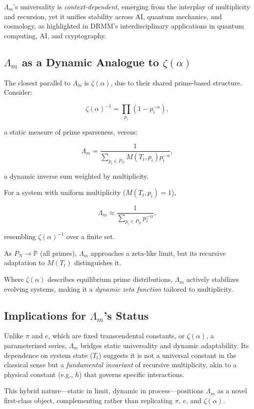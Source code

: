 \documentclass{article}
\theoremstyle{plain}
\begin{document}
\(\Lambda_m\)'s universality is \textit{context-dependent}, emerging from the interplay of multiplicity and recursion, yet it unifies stability across AI, quantum mechanics, and cosmology, as highlighted in DRMM's interdisciplinary applications in quantum computing, AI, and cryptography.

\subsection{\(\Lambda_m\) as a Dynamic Analogue to \(\zeta(\alpha)\)}

The closest parallel to \(\Lambda_m\) is \(\zeta(\alpha)\), due to their shared prime-based structure. Consider:

\[
\zeta(\alpha)^{-1} = \prod_{p_i} (1 - p_i^{-\alpha}),
\]

a static measure of prime sparseness, versus:

\[
\Lambda_m = \frac{1}{\sum_{p_i \in P_N} M(T_t, p_i) p_i^{-\alpha}},
\]

a dynamic inverse sum weighted by multiplicity. 

For a system with uniform multiplicity (\(M(T_t, p_i) = 1\)), 

\[
\Lambda_m \approx \frac{1}{\sum_{p_i \in P_N} p_i^{-\alpha}},
\]

resembling \(\zeta(\alpha)^{-1}\) over a finite set. 

As \(P_N \to \mathbb{P}\) (all primes), \(\Lambda_m\) approaches a zeta-like limit, but its recursive adaptation to \(M(T_t)\) distinguishes it. 

Where \(\zeta(\alpha)\) describes equilibrium prime distributions, \(\Lambda_m\) actively stabilizes evolving systems, making it a \textit{dynamic zeta function} tailored to multiplicity.

\subsection{Implications for \(\Lambda_m\)'s Status}

Unlike \(\pi\) and \(e\), which are fixed transcendental constants, or \(\zeta(\alpha)\), a parameterized series, \(\Lambda_m\) bridges static universality and dynamic adaptability. Its dependence on system state (\(T_t\)) suggests it is not a universal constant in the classical sense but a \textit{fundamental invariant} of recursive multiplicity, akin to a physical constant (e.g., \(\hbar\)) that governs specific interactions.

This hybrid nature—static in limit, dynamic in process—positions \(\Lambda_m\) as a novel first-class object, complementing rather than replicating \(\pi\), \(e\), and \(\zeta(\alpha)\).
\end{document}

